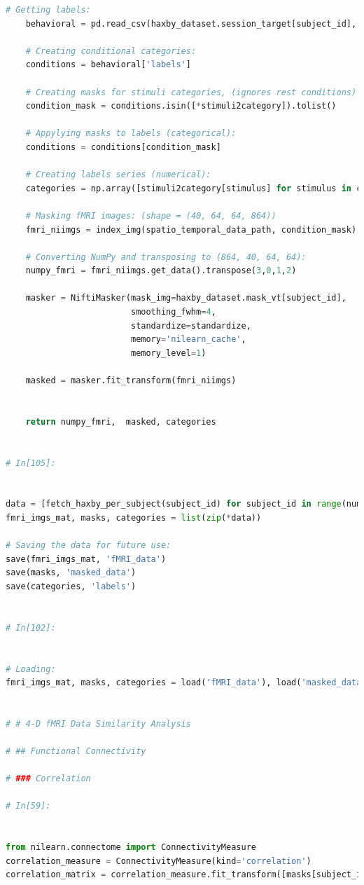 \documentclass[10pt, twocolumn, letterpaper]{article}
\begin{document}
\begin{lstlisting}[language=Python]
    # Getting labels:
    behavioral = pd.read_csv(haxby_dataset.session_target[subject_id], delimiter = ' ')
    
    # Creating conditional categories:
    conditions = behavioral['labels']
    
    # Creating masks for stimuli categories, (ignores rest conditions)
    condition_mask = conditions.isin([*stimuli2category]).tolist()
    
    # Appylying masks to labels (categorical):
    conditions = conditions[condition_mask]
    
    # Creating labels series (numerical):
    categories = np.array([stimuli2category[stimulus] for stimulus in conditions])
    
    # Masking fMRI images: (shape = (40, 64, 64, 864))
    fmri_niimgs = index_img(spatio_temporal_data_path, condition_mask)
    
    # Converting NumPy and transposing to (864, 40, 64, 64):
    numpy_fmri = fmri_niimgs.get_data().transpose(3,0,1,2)
    
    masker = NiftiMasker(mask_img=haxby_dataset.mask_vt[subject_id],
                         smoothing_fwhm=4,
                         standardize=standardize,
                         memory='nilearn_cache',
                         memory_level=1)

    masked = masker.fit_transform(fmri_niimgs)
    
    
    return numpy_fmri,  masked, categories


# In[105]:


data = [fetch_haxby_per_subject(subject_id) for subject_id in range(num_subjects)]
fmri_imgs_mat, masks, categories = list(zip(*data))

# Saving the data for future use:
save(fmri_imgs_mat, 'fMRI_data')
save(masks, 'masked_data')
save(categories, 'labels')


# In[102]:


# Loading:
fmri_imgs_mat, masks, categories = load('fMRI_data'), load('masked_data'), load('labels')


# # 4-D fMRI Data Similarity Analysis

# ## Functional Connectivity

# ### Correlation 

# In[59]:


from nilearn.connectome import ConnectivityMeasure
correlation_measure = ConnectivityMeasure(kind='correlation')
correlation_matrix = correlation_measure.fit_transform([masks[subject_id]])[0]


\end{lstlisting}
\end{document}
